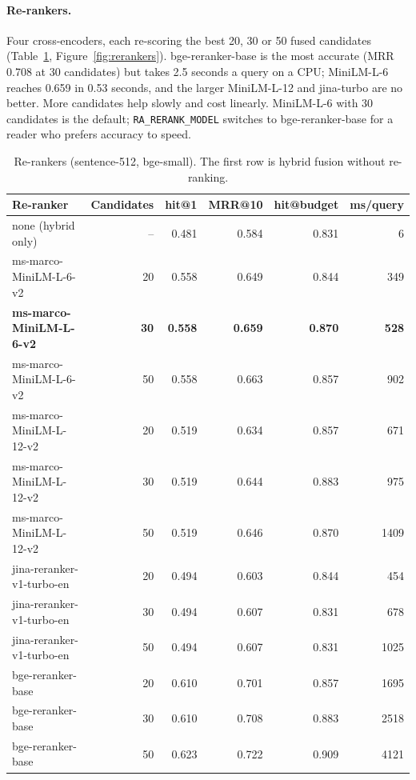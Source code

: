 \documentclass[11pt,a4paper]{article}
\newcommand{\code}[1]{\texttt{#1}}
\begin{document}
\paragraph{Re-rankers.} Four cross-encoders, each re-scoring the best 20, 30 or 50 fused candidates
(Table~\ref{tab:rerankers}, Figure~\ref{fig:rerankers}). bge-reranker-base is the most accurate (MRR 0.708
at 30 candidates) but takes 2.5 seconds a query on a CPU; MiniLM-L-6 reaches 0.659 in 0.53 seconds, and the
larger MiniLM-L-12 and jina-turbo are no better. More candidates help slowly and cost linearly. MiniLM-L-6
with 30 candidates is the default; \code{RA\_RERANK\_MODEL} switches to bge-reranker-base for a reader who
prefers accuracy to speed.

\begin{table}[htbp]\centering\small
\begin{tabular}{@{}lrrrrr@{}}
\toprule
Re-ranker & Candidates & hit@1 & MRR@10 & hit@budget & ms/query \\
\midrule
none (hybrid only) & -- & 0.481 & 0.584 & 0.831 & 6 \\
ms-marco-MiniLM-L-6-v2 & 20 & 0.558 & 0.649 & 0.844 & 349 \\
\textbf{ms-marco-MiniLM-L-6-v2} & \textbf{30} & \textbf{0.558} & \textbf{0.659} & \textbf{0.870} & \textbf{528} \\
ms-marco-MiniLM-L-6-v2 & 50 & 0.558 & 0.663 & 0.857 & 902 \\
ms-marco-MiniLM-L-12-v2 & 20 & 0.519 & 0.634 & 0.857 & 671 \\
ms-marco-MiniLM-L-12-v2 & 30 & 0.519 & 0.644 & 0.883 & 975 \\
ms-marco-MiniLM-L-12-v2 & 50 & 0.519 & 0.646 & 0.870 & 1409 \\
jina-reranker-v1-turbo-en & 20 & 0.494 & 0.603 & 0.844 & 454 \\
jina-reranker-v1-turbo-en & 30 & 0.494 & 0.607 & 0.831 & 678 \\
jina-reranker-v1-turbo-en & 50 & 0.494 & 0.607 & 0.831 & 1025 \\
bge-reranker-base & 20 & 0.610 & 0.701 & 0.857 & 1695 \\
bge-reranker-base & 30 & 0.610 & 0.708 & 0.883 & 2518 \\
bge-reranker-base & 50 & 0.623 & 0.722 & 0.909 & 4121 \\
\bottomrule
\end{tabular}
\caption{Re-rankers (sentence-512, bge-small). The first row is hybrid fusion without re-ranking.}
\label{tab:rerankers}
\end{table}
\end{document}
